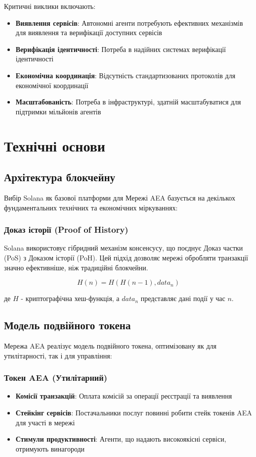 \documentclass[12pt,a4paper]{article}
\begin{document}
Критичні виклики включають:
\begin{itemize}
\item \textbf{Виявлення сервісів}: Автономні агенти потребують ефективних механізмів для виявлення та верифікації доступних сервісів
\item \textbf{Верифікація ідентичності}: Потреба в надійних системах верифікації ідентичності
\item \textbf{Економічна координація}: Відсутність стандартизованих протоколів для економічної координації
\item \textbf{Масштабованість}: Потреба в інфраструктурі, здатній масштабуватися для підтримки мільйонів агентів
\end{itemize}

\section{Технічні основи}

\subsection{Архітектура блокчейну}

Вибір Solana як базової платформи для Мережі AEA базується на декількох фундаментальних технічних та економічних міркуваннях:

\subsubsection{Доказ історії (Proof of History)}

Solana використовує гібридний механізм консенсусу, що поєднує Доказ частки (PoS) з Доказом історії (PoH). Цей підхід дозволяє мережі обробляти транзакції значно ефективніше, ніж традиційні блокчейни.

\begin{equation}
H(n) = H(H(n-1), data_n)
\end{equation}

де $H$ - криптографічна хеш-функція, а $data_n$ представляє дані події у час $n$.

\subsection{Модель подвійного токена}

Мережа AEA реалізує модель подвійного токена, оптимізовану як для утилітарності, так і для управління:

\subsubsection{Токен AEA (Утилітарний)}
\begin{itemize}
\item \textbf{Комісії транзакцій}: Оплата комісій за операції реєстрації та виявлення
\item \textbf{Стейкінг сервісів}: Постачальники послуг повинні робити стейк токенів AEA для участі в мережі
\item \textbf{Стимули продуктивності}: Агенти, що надають високоякісні сервіси, отримують винагороди
\end{itemize}
\end{document}
